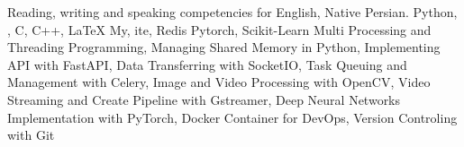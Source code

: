 
\begin{rubric}{}
\entry*[Languages]
	  Reading, writing and speaking competencies for English, Native Persian.
	  Python, , C, C++, \LaTeX
\entry*[Databases]
	My, ite, Redis
\entry*[ML Frameworks]
	Pytorch, Scikit-Learn
\entry*[Misc.]
	Multi Processing and Threading Programming, Managing Shared Memory in Python, Implementing API with FastAPI, Data Transferring with SocketIO, Task Queuing and Management with Celery, Image and Video Processing with OpenCV, Video Streaming and Create Pipeline with Gstreamer, Deep Neural Networks Implementation with PyTorch, Docker Container for DevOps, Version Controling with Git
\end{rubric}
